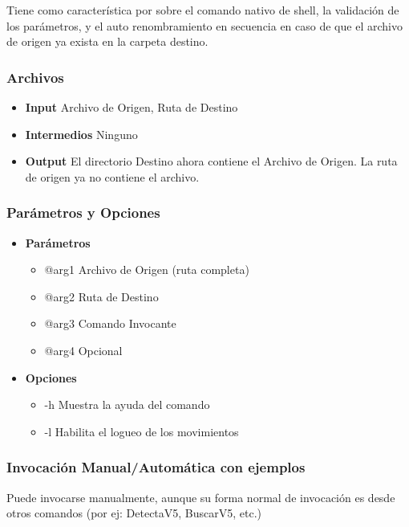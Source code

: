 \documentclass[a4paper,10pt,titlepage]{article}
\begin{document}
			Tiene como caracter\'istica por sobre el comando nativo de shell, la validaci\'on de los par\'ametros, y el auto renombramiento en secuencia en caso de que el archivo de origen ya exista en la carpeta destino.

		\subsubsection{Archivos}
			\begin {itemize}
				\item \textbf{Input } {Archivo de Origen, Ruta de Destino}
				\item \textbf{Intermedios } {Ninguno}
				\item \textbf{Output } {El directorio Destino ahora contiene el Archivo de Origen. La ruta de origen ya no contiene el archivo.}
			\end{itemize}

		\subsubsection{Par\'ametros y Opciones}
			\begin {itemize}
				\item \textbf{Par\'ametros} {
					\begin{itemize}
						\item {@arg1 }{Archivo de Origen (ruta completa)} 
						\item {@arg2 }{Ruta de Destino } 
						\item {@arg3 }{Comando Invocante} 
						\item {@arg4 }{Opcional} 
					\end{itemize}
				}
				\item \textbf{Opciones}{
					\begin{itemize}
						\item {-h }{Muestra la ayuda del comando} 
						\item {-l }{Habilita el logueo de los movimientos} 
					\end{itemize}
				}
			\end{itemize}
	
		\subsubsection{Invocaci\'on Manual/Autom\'atica con ejemplos}
			Puede invocarse manualmente, aunque su forma normal de invocaci\'on es desde otros comandos (por ej: DetectaV5, BuscarV5, etc.)
			
\end{document}
